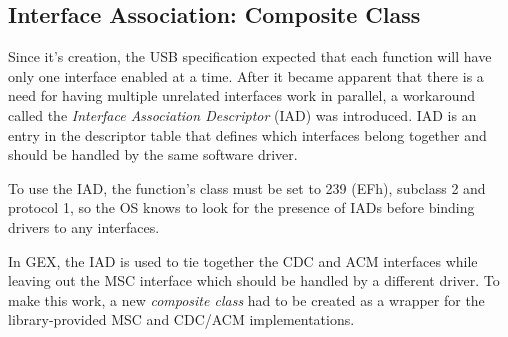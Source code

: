 \subsection{Interface Association: Composite Class}

Since it's creation, the USB specification expected that each function will have only one interface enabled at a time. After it became apparent that there is a need for having multiple unrelated interfaces work in parallel, a workaround called the \textit{Interface Association Descriptor} (IAD) was introduced. IAD is an entry in the descriptor table that defines which interfaces belong together and should be handled by the same software driver.

To use the IAD, the function's class must be set to 239 (EFh), subclass 2 and protocol 1, so the OS knows to look for the presence of IADs before binding drivers to any interfaces. 


In GEX, the IAD is used to tie together the CDC and ACM interfaces while leaving out the MSC interface which should be handled by a different driver. To make this work, a new \textit{composite class} had to be created as a wrapper for the library-provided MSC and CDC/ACM implementations.





